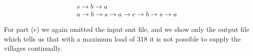 \begin{align}
    s \rightarrow b \rightarrow a \\
    a \rightarrow b \rightarrow s \rightarrow a \rightarrow c \rightarrow b \rightarrow s \rightarrow a
\end{align}

For part (c) we again omitted the input smt file, and we show only the output file  which tells us that with a maximum load of 318 it is not possible to supply the villages continually.
